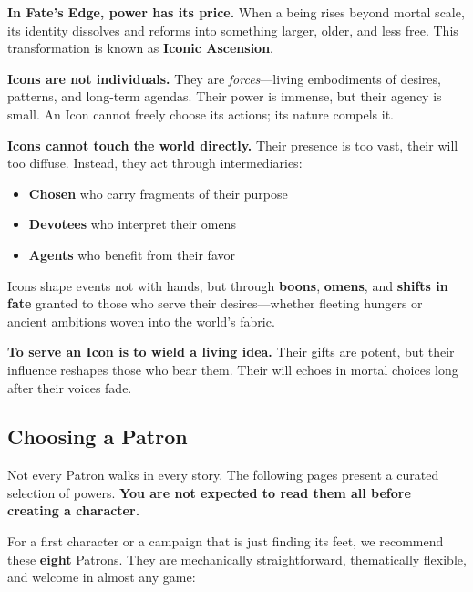 \begin{tcolorbox}[
  colback=gray!5!white,
  colframe=gray!60!black,
  enhanced,
  title=\textbf{Iconic Ascension: The Fate of Great Power},
  fonttitle=\bfseries,
  left=1em,
  right=1em,
  top=0.75em,
  bottom=0.75em,
  borderline={0.5pt}{0pt}{gray!60!black},
,breakable]
\textbf{In Fate's Edge, power has its price.}  
When a being rises beyond mortal scale, its identity dissolves and reforms into something larger, older, and less free. This transformation is known as \textbf{Iconic Ascension}.

\medskip
\textbf{Icons are not individuals.} They are \emph{forces}---living embodiments of desires, patterns, and long-term agendas. Their power is immense, but their agency is small. An Icon cannot freely choose its actions; its nature compels it.

\medskip
\textbf{Icons cannot touch the world directly.} Their presence is too vast, their will too diffuse. Instead, they act through intermediaries:
\begin{itemize}[noitemsep,topsep=2pt]
    \item \textbf{Chosen} who carry fragments of their purpose
    \item \textbf{Devotees} who interpret their omens
    \item \textbf{Agents} who benefit from their favor
\end{itemize}

\medskip
Icons shape events not with hands, but through \textbf{boons}, \textbf{omens}, and \textbf{shifts in fate} granted to those who serve their desires---whether fleeting hungers or ancient ambitions woven into the world's fabric.

\medskip
\textbf{To serve an Icon is to wield a living idea.} Their gifts are potent, but their influence reshapes those who bear them. Their will echoes in mortal choices long after their voices fade.
\end{tcolorbox}

\subsection{Choosing a Patron}
\label{subsec:choosing-a-patron}

Not every Patron walks in every story. The following pages present a curated selection of powers. \textbf{You are not expected to read them all before creating a character.}

\medskip
For a first character or a campaign that is just finding its feet, we recommend these \textbf{eight} Patrons. They are mechanically straightforward, thematically flexible, and welcome in almost any game:

